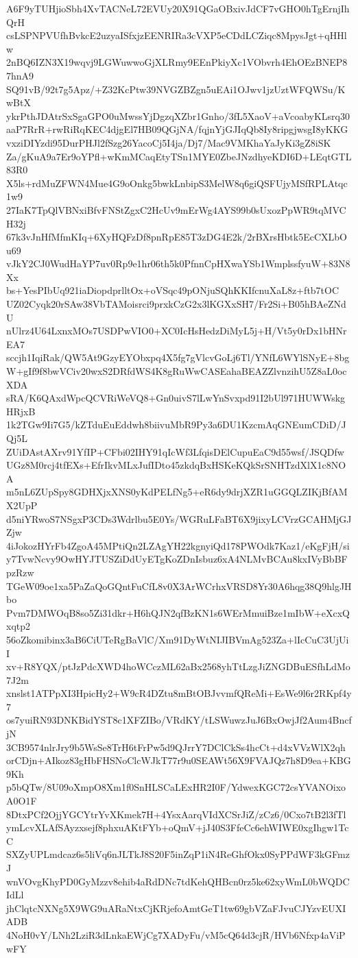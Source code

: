 A6F9yTUHjioSbh4XvTACNeL72EVUy20X91QGaOBxivJdCF7vGHO0hTgErnjIhQrH
csLSPNPVUfhBvkcE2uzyaISfxjzEENRIRa3cVXP5eCDdLCZiqc8MpysJgt+qHHlw
2nBQ6IZN3X19wqvj9LGWuwwoGjXLRmy9EEnPkiyXc1VObvrh4EhOEzBNEP87hnA9
SQ91vB/92t7g5Apz/+Z32KcPtw39NVGZBZgn5uEAi1OJwv1jzUztWFQWSu/KwBtX
ykrPthJDAtrSxSgaGPO0uMwssYjDgzqXZbr1Gnho/3fL5XaoV+aVcoabyKLsrq30
aaP7RrR+rwRiRqKEC4djgEl7HB09QGjNA/fqjnYjGJIqQb8Iy8ripgjwsgI8yKKG
vxziDIYzdi95DurPHJl2fSzg26YacoCj5I4ja/Dj7/Mac9VMKhaYaJyKi3gZ8iSK
Za/gKuA9a7Er9oYPfl+wKmMCaqEtyTSn1MYE0ZbeJNzdhyeKDI6D+LEqtGTL83R0
X5ls+rdMuZFWN4Mue4G9oOnkg5bwkLnbipS3MelW8q6giQSFUjyMSfRPLAtqc1w9
27IaK7TpQlVBNxiBfvFNStZgxC2HcUv9mErWg4AYS99b0sUxozPpWR9tqMVCH32j
67k3vJnHfMfmKIq+6XyHQFzDf8pnRpE85T3zDG4E2k/2rBXrsHbtk5EcCXLbOu69
vJkY2CJ0WudHaYP7uv0Rp9e1hr06th5k0PfnnCpHXwaYSb1WmplssfyuW+83N8Xx
bs+YesPIbUq921iaDiopdprlltOx+oVSqc49pONjuSQhKKIfcnuXaL8z+ftb7tOC
UZ02Cyqk20rSAw38VbTAMoisrci9prxkCzG2x3lKGXxSH7/Fr2Si+B05hBAeZNdU
nUlrz4U64LxnxMOs7USDPwVIO0+XC0IcHsHedzDiMyL5j+H/Vt5y0rDx1bHNrEA7
sccjh1IqiRak/QW5At9GzyEYObxpq4X5fg7gVlcvGoLj6Tl/YNfL6WYlSNyE+8bg
W+gIf9f8bwVCiv20wxS2DRfdWS4K8gRuWwCASEahaBEAZZlvnzihU5Z8aL0ocXDA
sRA/K6QAxdWpcQCVRiWeVQ8+Gn0uivS7lLwYnSvxpd91I2bUl971HUWWskgHRjxB
1k2TGw9Ii7G5/kZTduEuEddwh8biivuMbR9Py3a6DU1KzcmAqGNEumCDiD/JQj5L
ZUiDAstAXrv91YfIP+CFbi02IHY91qIcWf3LfqisDElCupuEaC9d55wsf/JSQDfw
UGz8M0rcj4tfEXs+EfrIkvMLxJufIDto45zkdqBxHSKeKQkSrSNHTzdXlX1c8NOA
m5nL6ZUpSpy8GDHXjxXNS0yKdPELfNg5+eR6dy9drjXZR1uGGQLZIKjBfAMX2UpP
d5niYRwoS7NSgxP3CDs3Wdrlbu5E0Ys/WGRuLFaBT6X9jixyLCVrzGCAHMjGJZjw
4iJokozHYrFb4ZgoA45MPtiQn2LZAgYH22kgnyiQd178PWOdk7Kaz1/eKgFjH/si
y7TvwNcvy9OwHYJTUSZiDdUyETgKoZDnIsbuz6xA4NLMvBCAu8kxIVyBbBFpzRzw
TGeW09oe1xa5PaZaQoGQntFuCfL8v0X3ArWCrhxVRSD8Yr30A6hqg38Q9hlgJHbo
Pvm7DMWOqB8so5Zi31dkr+H6hQJN2qfBzKN1s6WErMmuiBze1mIbW+eXcxQxqtp2
56oZkomibinx3aB6CiUTeRgBaVlC/Xm91DyWtNIJIBVmAg523Za+lIcCuC3UjUiI
xv+R8YQX/ptJzPdcXWD4hoWCczML62aBx2568yhTtLzgJiZNGDBuESfhLdMo7J2m
xnslst1ATPpXI3HpicHy2+W9cR4DZtu8mBtOBJvvmfQReMi+EsWe9l6r2RKpf4y7
os7yuiRN93DNKBidYST8c1XFZIBo/VRdKY/tLSWuwzJuJ6BxOwjJf2Aum4BncfjN
3CB9574nlrJry9b5WsSe8TrH6tFrPw5d9QJrrY7DClCkSs4hcCt+d4xVVzWlX2qh
orCDjn+AIkoz83gHbFHSNoClcWJkT77r9u0SEAWt56X9FVAJQz7h8D9ea+KBG9Kh
p5bQTw/8U09oXmpO8Xm1f0SnHLSCaLExHR2I0F/YdwexKGC72csYVANOixoA0O1F
8DtxPCf2OjjYGCYtrYvXKmek7H+4YsxAarqVIdXCSrJiZ/zCz6/0Cxo7tB2l3fTl
ymLcvXLAfSAyzxsejf8phxuAKtFYb+oQmV+jJ40S3FfeCc6ehWIWE0xgIhgw1TcC
SXZyUPLmdcaz6s5liVq6nJLTkJ8S20F5inZqP1iN4ReGhfOkx0SyPPdWF3kGFmzJ
wnVOvgKhyPD0GyMzzv8ehib4aRdDNc7tdKehQHBcn0rz5ke62xyWmL0bWQDCIdLl
jhClqtcNXNg5X9WG9uARaNtxCjKRjefoAmtGeT1tw69gbVZaFJvuCJYzvEUXIADB
4NoH0vY/LNh2LziR3dLnkaEWjCg7XADyFu/vM5cQ64d3cjR/HVb6Nfxp4aViPwFY
